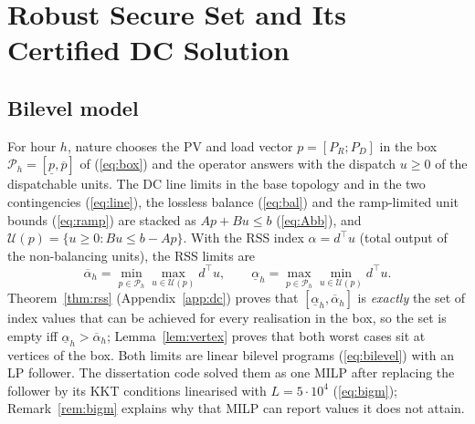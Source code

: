 \section{Robust Secure Set and Its Certified DC Solution}
\label{sec:rss}
\subsection{Bilevel model}
For hour $h$, nature chooses the PV and load vector $p=[P_R;P_D]$ in the box
$\mathcal P_h=[\underline p,\overline p]$ of (\ref{eq:box}) and the operator answers with the
dispatch $u\ge0$ of the dispatchable units. The DC line limits in the base topology and
in the two contingencies (\ref{eq:line}), the lossless balance (\ref{eq:bal}) and the
ramp-limited unit bounds (\ref{eq:ramp}) are stacked as $Ap+Bu\le b$ (\ref{eq:Abb}), and
$\mathcal U(p)=\{u\ge0:Bu\le b-Ap\}$. With the RSS index $\alpha=d^\top u$ (total output of
the non-balancing units), the RSS limits are~\cite{abdillah2017thesis,yorino2018}
\begin{equation}
\overline\alpha_h=\min_{p\in\mathcal P_h}\max_{u\in\mathcal U(p)}d^\top u,\qquad
\underline\alpha_h=\max_{p\in\mathcal P_h}\min_{u\in\mathcal U(p)}d^\top u .
\label{eq:rss}
\end{equation}
Theorem~\ref{thm:rss} (Appendix~\ref{app:dc}) proves that $[\underline\alpha_h,\overline\alpha_h]$ is
\emph{exactly} the set of index values that can be achieved for every realisation in the
box, so the set is empty iff $\underline\alpha_h>\overline\alpha_h$; Lemma~\ref{lem:vertex} proves
that both worst cases sit at vertices of the box. Both limits are linear bilevel programs
(\ref{eq:bilevel}) with an LP follower. The dissertation code solved them as one MILP after
replacing the follower by its KKT conditions linearised with $L=5\cdot10^4$
(\ref{eq:bigm}); Remark~\ref{rem:bigm} explains why that MILP can report values it does
not attain.

